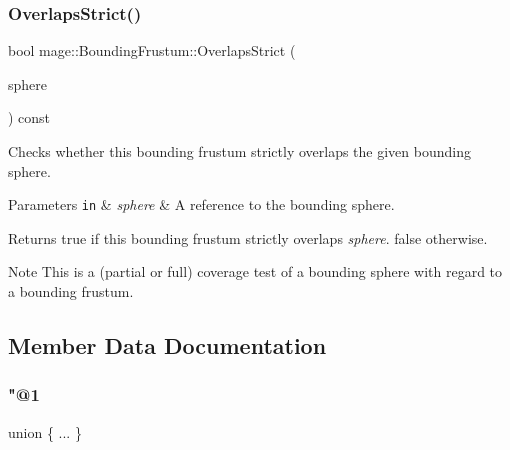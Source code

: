 \subsubsection{\texorpdfstring{Overlaps\+Strict()}{OverlapsStrict()}\hspace{0.1cm}{\footnotesize\ttfamily [2/2]}}
{\footnotesize\ttfamily bool mage\+::\+Bounding\+Frustum\+::\+Overlaps\+Strict (\begin{DoxyParamCaption}\item[{const \mbox{\hyperlink{classmage_1_1_bounding_sphere}{Bounding\+Sphere}} \&}]{sphere }\end{DoxyParamCaption}) const\hspace{0.3cm}{\ttfamily [noexcept]}}

Checks whether this bounding frustum strictly overlaps the given bounding sphere.


\begin{DoxyParams}[1]{Parameters}
\mbox{\tt in}  & {\em sphere} & A reference to the bounding sphere. \\
\hline
\end{DoxyParams}
\begin{DoxyReturn}{Returns}
{\ttfamily true} if this bounding frustum strictly overlaps {\itshape sphere}. {\ttfamily false} otherwise. 
\end{DoxyReturn}
\begin{DoxyNote}{Note}
This is a (partial or full) coverage test of a bounding sphere with regard to a bounding frustum. 
\end{DoxyNote}


\subsection{Member Data Documentation}
\mbox{\label{classmage_1_1_bounding_frustum_ae9104e73085b1a9bb6e6918edf92b25f}} 
\subsubsection{\texorpdfstring{"@1}{@1}}
{\footnotesize\ttfamily union \{ ... \} \hspace{0.3cm}{\ttfamily [private]}}

\mbox{\label{classmage_1_1_bounding_frustum_ae416db4ef5c2fc3eb2e2f25f6e45e747}} 
